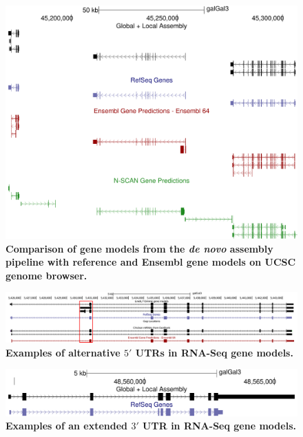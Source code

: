 \documentclass[10pt]{article}
\begin{document}
\begin{figure}[!ht]
\begin{center}
\includegraphics[width=5in]{model_comparisons.pdf}
\end{center}
\caption{
{\bf Comparison of gene models from the \emph{de novo} assembly pipeline with reference and Ensembl gene models on UCSC genome browser.}
}
\label{model_comparisons}
\end{figure}

\begin{figure}[!ht]
\begin{center}
\includegraphics[width=6in]{alter_5utr.pdf}
\end{center}
\caption{
{\bf Examples of alternative $5'$ UTRs in RNA-Seq gene models.}
}
\label{alter_5utr}
\end{figure}

\begin{figure}[!ht]
\begin{center}
\includegraphics[width=5in]{long_utr.pdf}
\end{center}
\caption{
{\bf Examples of an extended $3'$ UTR in RNA-Seq gene models.}
}
\label{long_utr}
\end{figure}
\end{document}
